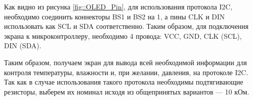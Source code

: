 Как видно из рисунка \ref{fig::OLED_Pin}, для использования протокола I2C, необходимо соединить коннекторы BS1 и BS2 на 1, а пины CLK и DIN использовать как SCL и SDA соответственно. Таким образом, для подключения экрана к микроконтроллеру, необходимо 4 провода: VCC, GND, CLK (SCL), DIN (SDA).

Таким образом, получаем экран для вывода всей необходимой информации для контроля температуры, влажности и, при желании, давления, на протоколе I2C. Так как в случае использования такого протокола необходимы подтягивающие резисторы, выберем их номинал исходя из общепринятых вариантов --- 10 кОм.
